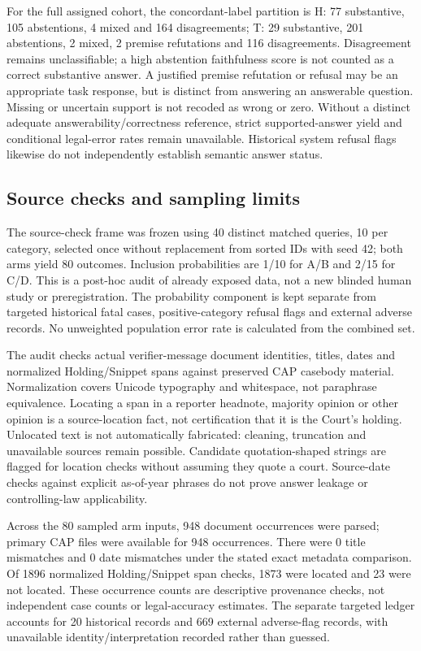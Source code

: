 For the full assigned cohort, the concordant-label partition is H: 77 substantive, 105 abstentions, 4 mixed and 164 disagreements; T: 29 substantive, 201 abstentions, 2 mixed, 2 premise refutations and 116 disagreements. Disagreement remains unclassifiable; a high abstention faithfulness score is not counted as a correct substantive answer. A justified premise refutation or refusal may be an appropriate task response, but is distinct from answering an answerable question. Missing or uncertain support is not recoded as wrong or zero. Without a distinct adequate answerability/correctness reference, strict supported-answer yield and conditional legal-error rates remain unavailable. Historical system refusal flags likewise do not independently establish semantic answer status.

\subsection{Source checks and sampling limits}
The source-check frame was frozen using 40 distinct matched queries, 10 per category, selected once without replacement from sorted IDs with seed 42; both arms yield 80 outcomes. Inclusion probabilities are 1/10 for A/B and 2/15 for C/D. This is a post-hoc audit of already exposed data, not a new blinded human study or preregistration. The probability component is kept separate from targeted historical fatal cases, positive-category refusal flags and external adverse records. No unweighted population error rate is calculated from the combined set.

The audit checks actual verifier-message document identities, titles, dates and normalized Holding/Snippet spans against preserved CAP casebody material. Normalization covers Unicode typography and whitespace, not paraphrase equivalence. Locating a span in a reporter headnote, majority opinion or other opinion is a source-location fact, not certification that it is the Court's holding. Unlocated text is not automatically fabricated: cleaning, truncation and unavailable sources remain possible. Candidate quotation-shaped strings are flagged for location checks without assuming they quote a court. Source-date checks against explicit as-of-year phrases do not prove answer leakage or controlling-law applicability.

Across the 80 sampled arm inputs, 948 document occurrences were parsed; primary CAP files were available for 948 occurrences. There were 0 title mismatches and 0 date mismatches under the stated exact metadata comparison. Of 1896 normalized Holding/Snippet span checks, 1873 were located and 23 were not located. These occurrence counts are descriptive provenance checks, not independent case counts or legal-accuracy estimates. The separate targeted ledger accounts for 20 historical records and 669 external adverse-flag records, with unavailable identity/interpretation recorded rather than guessed.

